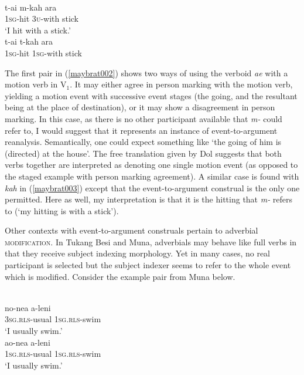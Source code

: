 \ea \label{maybrat003}
\\
\ea
\gll t-ai m-kah ara \\
1\textsc{sg}-hit 3\textsc{u}-with stick \\
\glft `I hit with a stick.' \\ 
\ex
\gll *t-ai t-kah ara \\ 
1\textsc{sg}-hit 1\textsc{sg}-with stick \\
\z
\z

The first pair in (\ref{maybrat002}) shows two ways of using the verboid \textit{ae} with a motion verb in V$_1$. It may either agree in person marking with the motion verb, yielding a motion event with successive event stages (the going, and the resultant being at the place of destination), or it may show a disagreement in person marking. In this case, as there is no other participant available that \textit{m-} could refer to, I would suggest that it represents an instance of event-to-argument reanalysis. Semantically, one could expect something like `the going of him is (directed) at the house'. The free translation given by Dol suggests that both verbs together are interpreted as denoting one single motion event (as opposed to the staged example with person marking agreement). A similar case is found with \textit{kah} in (\ref{maybrat003}) except that the event-to-argument construal is the only one permitted. Here as well, my interpretation is that it is the hitting that \textit{m-} refers to (`my hitting is with a stick').

Other contexts with event-to-argument construals pertain to adverbial \textsc{modification}. In Tukang Besi and Muna, adverbials may behave like full verbs in that they receive subject indexing morphology. Yet in many cases, no real participant is selected but the subject indexer seems to refer to the whole event which is modified. Consider the example pair from Muna below.

\ea \label{muna003}
\\
\ea
\gll no-nea a-leni \\
3\textsc{sg}.\textsc{rls}-usual 1\textsc{sg}.\textsc{rls}-swim \\
\glft `I usually swim.' \\ 
\ex
\gll ao-nea a-leni \\ 
1\textsc{sg}.\textsc{rls}-usual 1\textsc{sg}.\textsc{rls}-swim \\
\glft `I usually swim.' \\ 
\z
\z

